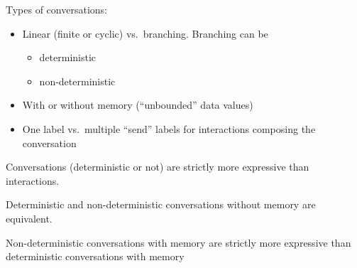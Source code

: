 Types of conversations:
\begin{itemize}
\item Linear (finite or cyclic) vs.\ branching.  Branching can be
  \begin{itemize}
  \item deterministic
  \item non-deterministic
  \end{itemize}
\item With or without memory (``unbounded'' data values)
\item One label vs.\ multiple ``send'' labels for interactions composing
  the conversation
\end{itemize}

Conversations (deterministic or not) are strictly more expressive than
interactions.

Deterministic and non-deterministic conversations without memory are
equivalent.

Non-deterministic conversations with memory are strictly more expressive
than deterministic conversations with memory
